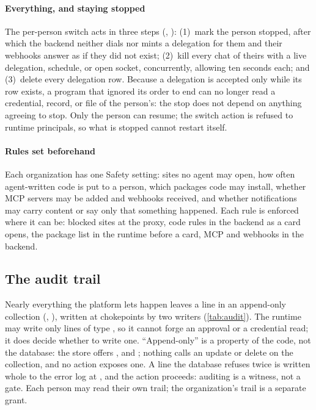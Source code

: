 \paragraph{Everything, and staying stopped}
The per-person switch acts in three steps (,
): (1)~mark the person
stopped, after which the backend neither dials nor mints a delegation
for them and their webhooks answer as if they did not exist;
(2)~kill every chat of theirs with a live delegation, schedule, or open
socket, concurrently, allowing ten seconds each; and (3)~delete every
delegation row. Because a delegation is accepted only while its row
exists, a program that ignored its order to end can no longer read a
credential, record, or file of the person's: the stop does not depend
on anything agreeing to stop. Only the person can resume; the switch
action is refused to runtime principals, so what is stopped cannot
restart itself.

\paragraph{Rules set beforehand}
Each organization has one Safety setting: sites no agent may open, how
often agent-written code is put to a person, which packages code may
install, whether MCP servers may be added and webhooks received, and
whether notifications may carry content or say only that something
happened.
Each rule is enforced where it can be: blocked sites at the proxy, code
rules in the backend as a card opens, the package list in the runtime
before a card, MCP and webhooks in the backend.

\subsection{The audit trail}

Nearly everything the platform lets happen leaves a line in an
append-only collection (,
), written at chokepoints by two
writers (\cref{tab:audit}). The runtime may write only lines of type
, so it cannot forge an approval or a credential read;
it does decide whether to write one. ``Append-only'' is a property of
the code, not the database: the store offers ,
 and ; nothing calls an update or delete on
the collection, and no action exposes one. A line the database refuses
twice is written whole to the error log at , and the
action proceeds: auditing is a witness, not a gate. Each person may read
their own trail; the organization's trail is a separate grant.

